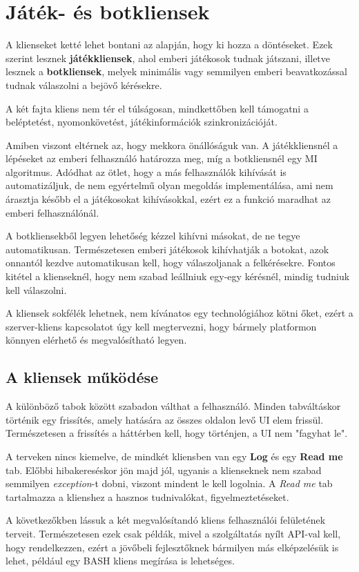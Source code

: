 \documentclass[twoside, a4paper, 12pt]{book}
\begin{document}
\section{Játék- és botkliensek}
A klienseket ketté lehet bontani az alapján, hogy ki hozza a döntéseket. Ezek szerint lesznek \textbf{játékkliensek}, ahol emberi játékosok tudnak játszani, illetve lesznek a \textbf{botkliensek}, melyek minimális vagy semmilyen emberi beavatkozással tudnak válaszolni a bejövő kérésekre.

A két fajta kliens nem tér el túlságosan, mindkettőben kell támogatni a beléptetést, nyomonkövetést, játékinformációk szinkronizációját.

Amiben viszont eltérnek az, hogy mekkora önállóságuk van. A játékkliensnél a lépéseket az emberi felhasználó határozza meg, míg a botkliensnél egy MI algoritmus. Adódhat az ötlet, hogy a más felhasználók kihívását is automatizáljuk, de nem egyértelmű olyan megoldás implementálása, ami nem árasztja később el a játékosokat kihívásokkal, ezért ez a funkció maradhat az emberi felhasználónál.

A botkliensekből legyen lehetőség kézzel kihívni másokat, de ne tegye automatikusan. Természetesen emberi játékosok kihívhatják a botokat, azok onnantól kezdve automatikusan kell, hogy válaszoljanak a felkérésekre.
Fontos kitétel a klienseknél, hogy nem szabad leállniuk egy-egy kérésnél, mindig tudniuk kell válaszolni.

A kliensek sokfélék lehetnek, nem kívánatos egy technológiához kötni őket, ezért a szerver-kliens kapcsolatot úgy kell megtervezni, hogy bármely platformon könnyen elérhető és megvalósítható legyen.

\subsection{A kliensek működése}
A különböző tabok között szabadon válthat a felhasználó. Minden tabváltáskor történik egy frissítés, amely hatására az összes oldalon levő UI elem frissül. Természetesen a frissítés a háttérben kell, hogy történjen, a UI nem "fagyhat le".

A terveken nincs kiemelve, de mindkét kliensben van egy \textbf{Log} és egy \textbf{Read me} tab. Előbbi hibakereséskor jön majd jól, ugyanis a klienseknek nem szabad semmilyen \textit{exception}-t dobni, viszont mindent le kell logolnia. A \textit{Read me} tab tartalmazza a klienshez a hasznos tudnivalókat, figyelmeztetéseket.

A következőkben lássuk a két megvalósítandó kliens felhasználói felületének terveit. Természetesen ezek csak példák, mivel a szolgáltatás nyílt API-val kell, hogy rendelkezzen, ezért a jövőbeli fejlesztőknek bármilyen más elképzelésük is lehet, például egy BASH kliens megírása is lehetséges.
\end{document}
